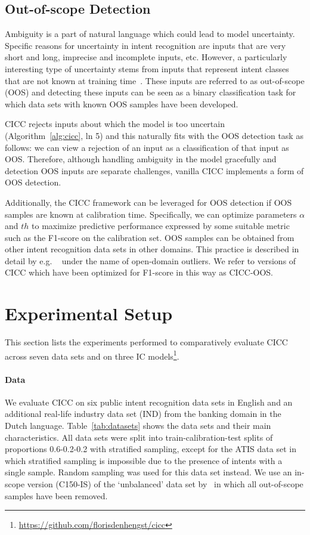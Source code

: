 \documentclass[11pt]{article}
\begin{document}
\subsection{Out-of-scope Detection}
Ambiguity is a part of natural language which could lead to model uncertainty. Specific reasons for uncertainty in intent recognition are inputs that are very short and long, imprecise and incomplete inputs, etc. However, a particularly interesting type of uncertainty stems from inputs that represent intent classes that are not known at training time~\cite{zhan2021out}. These inputs are referred to as out-of-scope (OOS) and detecting these inputs can be seen as a binary classification task for which data sets with known OOS samples have been developed.

CICC rejects inputs about which the model is too uncertain (Algorithm~\ref{alg:cicc}, ln 5) and this naturally fits with the OOS detection task as follows: we can view a rejection of an input as a classification of that input as OOS. Therefore, although handling ambiguity in the model gracefully and detection OOS inputs are separate challenges, vanilla CICC implements a form of OOS detection.

Additionally, the CICC framework can be leveraged for OOS detection if OOS samples are known at calibration time. Specifically, we can optimize parameters $\alpha$ and $th$ to maximize predictive performance expressed by some suitable metric such as the F1-score on the calibration set. OOS samples can be obtained from other intent recognition data sets in other domains. This practice is described in detail by e.g. ~\cite{zhan2021out} under the name of open-domain outliers. We refer to versions of CICC which have been optimized for F1-score in this way as CICC-OOS.

\section{Experimental Setup}
This section lists the experiments performed to comparatively evaluate CICC across seven data sets and on three IC models\footnote{
\url{https://github.com/florisdenhengst/cicc}}.


\paragraph{Data} We evaluate CICC on six public intent recognition data sets in English and an additional real-life industry data set (IND) from the banking domain in the Dutch language. Table~\ref{tab:datasets} shows the data sets and their main characteristics. All data sets were split into train-calibration-test splits of proportions 0.6-0.2-0.2 with stratified sampling, except for the ATIS data set in which stratified sampling is impossible due to the presence of intents with a single sample. Random sampling was used for this data set instead. We use an in-scope version (C150-IS) of the `unbalanced' data set by~\citet{larson-etal-2019-evaluation} in which all out-of-scope samples have been removed.
\end{document}
